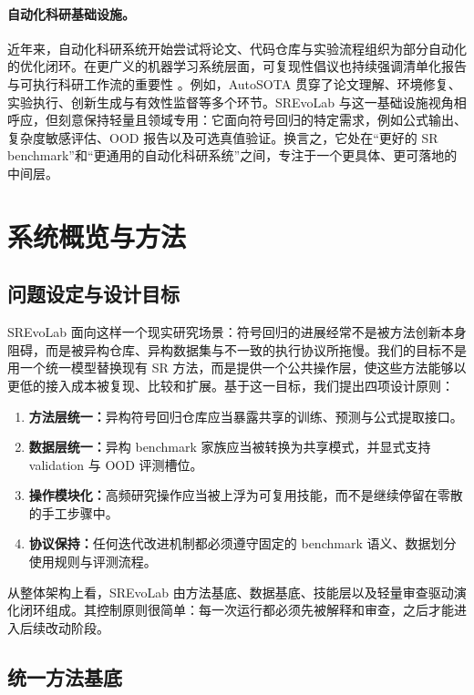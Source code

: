 \documentclass[UTF8]{ctexart}
\begin{document}
\paragraph{自动化科研基础设施。}
近年来，自动化科研系统开始尝试将论文、代码仓库与实验流程组织为部分自动化的优化闭环。在更广义的机器学习系统层面，可复现性倡议也持续强调清单化报告与可执行科研工作流的重要性 \citep{pineau2021improving}。例如，AutoSOTA \citep{li2026autosota} 贯穿了论文理解、环境修复、实验执行、创新生成与有效性监督等多个环节。SREvoLab 与这一基础设施视角相呼应，但刻意保持轻量且领域专用：它面向符号回归的特定需求，例如公式输出、复杂度敏感评估、OOD 报告以及可选真值验证。换言之，它处在“更好的 SR benchmark”和“更通用的自动化科研系统”之间，专注于一个更具体、更可落地的中间层。

\section{系统概览与方法}

\subsection{问题设定与设计目标}

SREvoLab 面向这样一个现实研究场景：符号回归的进展经常不是被方法创新本身阻碍，而是被异构仓库、异构数据集与不一致的执行协议所拖慢。我们的目标不是用一个统一模型替换现有 SR 方法，而是提供一个公共操作层，使这些方法能够以更低的接入成本被复现、比较和扩展。基于这一目标，我们提出四项设计原则：
\begin{enumerate}[leftmargin=1.5em]
    \item \textbf{方法层统一：}异构符号回归仓库应当暴露共享的训练、预测与公式提取接口。
    \item \textbf{数据层统一：}异构 benchmark 家族应当被转换为共享模式，并显式支持 validation 与 OOD 评测槽位。
    \item \textbf{操作模块化：}高频研究操作应当被上浮为可复用技能，而不是继续停留在零散的手工步骤中。
    \item \textbf{协议保持：}任何迭代改进机制都必须遵守固定的 benchmark 语义、数据划分使用规则与评测流程。
\end{enumerate}

从整体架构上看，SREvoLab 由方法基底、数据基底、技能层以及轻量审查驱动演化闭环组成。其控制原则很简单：每一次运行都必须先被解释和审查，之后才能进入后续改动阶段。

\subsection{统一方法基底}
\end{document}
